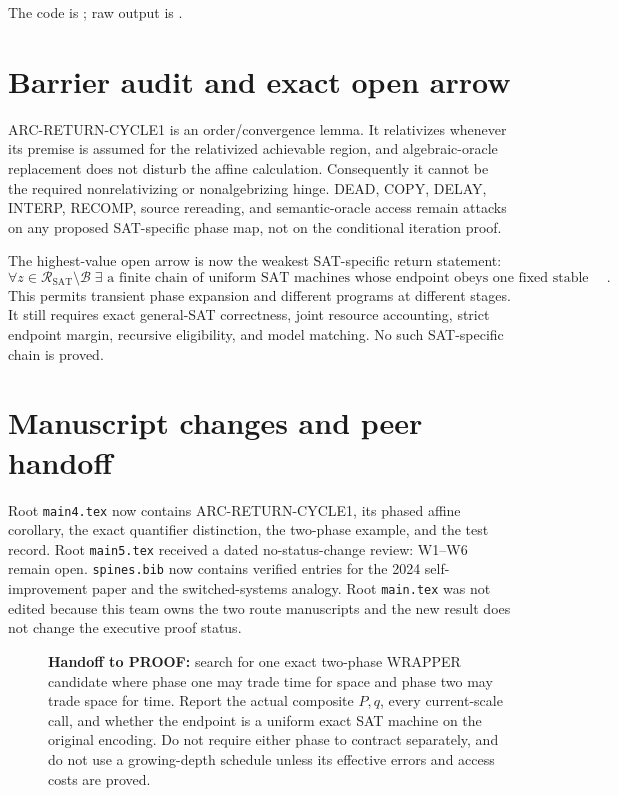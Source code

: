 \documentclass[11pt]{article}
\newcommand{\SAT}{\mathrm{SAT}}
\newcommand{\R}{\mathcal R_{\SAT}}
\newcommand{\B}{\mathcal B}
\begin{document}
The code is
; raw output is
.

\section{Barrier audit and exact open arrow}
ARC-RETURN-CYCLE1 is an order/convergence lemma. It relativizes whenever its
premise is assumed for the relativized achievable region, and algebraic-oracle
replacement does not disturb the affine calculation. Consequently it cannot
be the required nonrelativizing or nonalgebrizing hinge. DEAD, COPY, DELAY,
INTERP, RECOMP, source rereading, and semantic-oracle access remain attacks on
any proposed SAT-specific phase map, not on the conditional iteration proof.

The highest-value open arrow is now the weakest SAT-specific return statement:
\[
\boxed{
\forall z\in\R\setminus\B\;\exists\text{ a finite chain of uniform SAT
machines whose endpoint obeys one fixed stable composite envelope}.}
\]
This permits transient phase expansion and different programs at different
stages. It still requires exact general-SAT correctness, joint resource
accounting, strict endpoint margin, recursive eligibility, and model matching.
No such SAT-specific chain is proved.

\section{Manuscript changes and peer handoff}
Root \texttt{main4.tex} now contains ARC-RETURN-CYCLE1, its phased affine
corollary, the exact quantifier distinction, the two-phase example, and the
test record. Root \texttt{main5.tex} received a dated no-status-change review:
W1--W6 remain open. \texttt{spines.bib} now contains verified entries for the
2024 self-improvement paper and the switched-systems analogy. Root
\texttt{main.tex} was not edited because this team owns the two route
manuscripts and the new result does not change the executive proof status.

\begin{description}
\item[] \textbf{Handoff to PROOF:} search for one exact two-phase WRAPPER
candidate where phase one may trade time for space and phase two may trade
space for time. Report the actual composite $P,q$, every current-scale call,
and whether the endpoint is a uniform exact SAT machine on the original
encoding. Do not require either phase to contract separately, and do not use a
growing-depth schedule unless its effective errors and access costs are proved.
\end{description}



\end{document}
